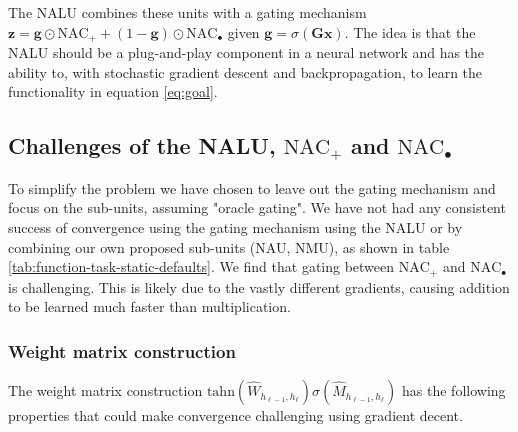 The NALU combines these units with a gating mechanism $\mathbf{z} = \mathbf{g} \odot \text{NAC}_{+} + (1 - \mathbf{g}) \odot \text{NAC}_{\bullet}$ given $\mathbf{g} = \sigma(\mathbf{G} \mathbf{x})$. The idea is that the NALU should be a plug-and-play component in a neural network and has the ability to, with stochastic gradient descent and backpropagation, to learn the functionality in equation \ref{eq:goal}.

\subsection{Challenges of the NALU, $\text{NAC}_{+}$ and $\text{NAC}_{\bullet}$}
To simplify the problem we have chosen to leave out the gating mechanism and focus on the sub-units, assuming "oracle gating". We have not had any consistent success of convergence using the gating mechanism using the NALU or by combining our own proposed sub-units (NAU, NMU), as shown in table \ref{tab:function-task-static-defaults}. We find that gating between $\text{NAC}_{+}$ and $\text{NAC}_{\bullet}$ is challenging. This is likely due to the vastly different gradients, causing addition to be learned much faster than multiplication.





\subsubsection{Weight matrix construction}\label{sssec:weight}

The weight matrix construction $\mathrm{tahn}(\hat{W}_{h_{\ell-1},h_\ell}) \sigma(\hat{M}_{h_{\ell-1},h_\ell})$ has the following properties that could make convergence challenging using gradient decent.


